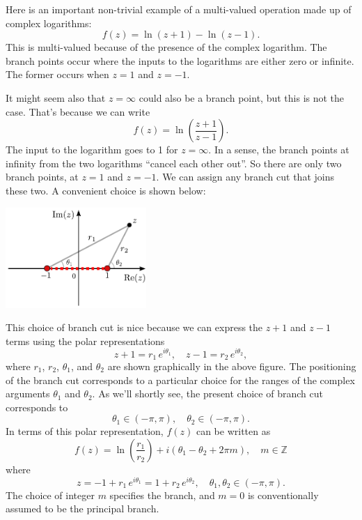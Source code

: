 \documentclass[10pt,a4paper]{article}
\begin{document}
Here is an important non-trivial example of a multi-valued operation
made up of complex logarithms:
\begin{equation}
f(z) = \ln(z+1) - \ln(z-1).
\end{equation}
This is multi-valued because of the presence of the complex logarithm.
The branch points occur where the inputs to the logarithms are either
zero or infinite. The former occurs when $z = 1$ and $z = -1$.

It might seem also that $z = \infty$ could also be a branch point, but
this is not the case.  That's because we can write
\begin{equation}
f(z) = \ln\left(\frac{z+1}{z-1}\right).
\end{equation}
The input to the logarithm goes to 1 for $z = \infty$. In a sense, the
branch points at infinity from the two logarithms ``cancel each other
out''. So there are only two branch points, at $z = 1$ and $z = -1$.
We can assign any branch cut that joins these two. A convenient choice
is shown below:

\begin{center}
  \includegraphics[width=0.4\textwidth]{branch_cut_example}
\end{center}

This choice of branch cut is nice because we can express the $z+1$ and
$z - 1$ terms using the polar representations
\begin{equation}
  z + 1 = r_1\,e^{i\theta_1}, \quad z - 1 = r_2\, e^{i\theta_2},
\end{equation}
where $r_1$, $r_2$, $\theta_1$, and $\theta_2$ are shown
graphically in the above figure. The positioning of the branch cut
corresponds to a particular choice for the ranges of the complex
arguments $\theta_1$ and $\theta_2$. As we'll shortly see, the
present choice of branch cut corresponds to
\begin{equation}
  \theta_1 \in (-\pi,\pi), \quad \theta_2 \in (-\pi,\pi).
\end{equation}
In terms of this polar representation, $f(z)$ can be written as
\begin{equation}
  f(z) = \ln\left(\frac{r_1}{r_2}\right) + i(\theta_1 - \theta_2 + 2\pi m), \quad m\in\mathbb{Z}
\end{equation}
where
\begin{equation*}
  z = -1 + r_1\,e^{i\theta_1} = 1 + r_2\,e^{i\theta_2},\quad\theta_1, \theta_2 \in (-\pi,\pi).
\end{equation*}
The choice of integer $m$ specifies the branch, and $m = 0$ is
conventionally assumed to be the principal branch.
\end{document}
